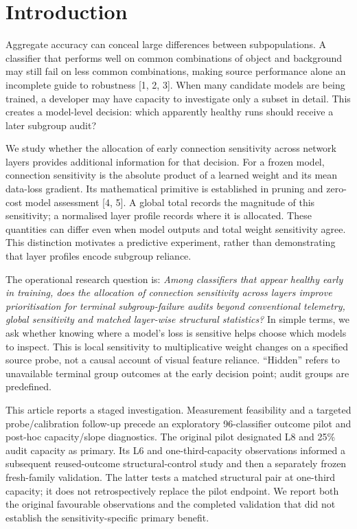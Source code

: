 \section{Introduction}

\label{sec:intro}
Aggregate accuracy can conceal large differences between subpopulations. A classifier that performs well on common combinations of object and background may still fail on less common combinations, making source performance alone an incomplete guide to robustness [1, 2, 3]. When many candidate models are being trained, a developer may have capacity to investigate only a subset in detail. This creates a model-level decision: which apparently healthy runs should receive a later subgroup audit?

We study whether the allocation of early connection sensitivity across network layers provides additional information for that decision. For a frozen model, connection sensitivity is the absolute product of a learned weight and its mean data-loss gradient. Its mathematical primitive is established in pruning and zero-cost model assessment [4, 5]. A global total records the magnitude of this sensitivity; a normalised layer profile records where it is allocated. These quantities can differ even when model outputs and total weight sensitivity agree. This distinction motivates a predictive experiment, rather than demonstrating that layer profiles encode subgroup reliance.

The operational research question is: \emph{Among classifiers that appear healthy early in training, does the allocation of connection sensitivity across layers improve prioritisation for terminal subgroup-failure audits beyond conventional telemetry, global sensitivity and matched layer-wise structural statistics?} In simple terms, we ask whether knowing where a model's loss is sensitive helps choose which models to inspect. This is local sensitivity to multiplicative weight changes on a specified source probe, not a causal account of visual feature reliance. ``Hidden'' refers to unavailable terminal group outcomes at the early decision point; audit groups are predefined.

This article reports a staged investigation. Measurement feasibility and a targeted probe/calibration follow-up precede an exploratory 96-classifier outcome pilot and post-hoc capacity/slope diagnostics. The original pilot designated L8 and 25\% audit capacity as primary. Its L6 and one-third-capacity observations informed a subsequent reused-outcome structural-control study and then a separately frozen fresh-family validation. The latter tests a matched structural pair at one-third capacity; it does not retrospectively replace the pilot endpoint. We report both the original favourable observations and the completed validation that did not establish the sensitivity-specific primary benefit.

